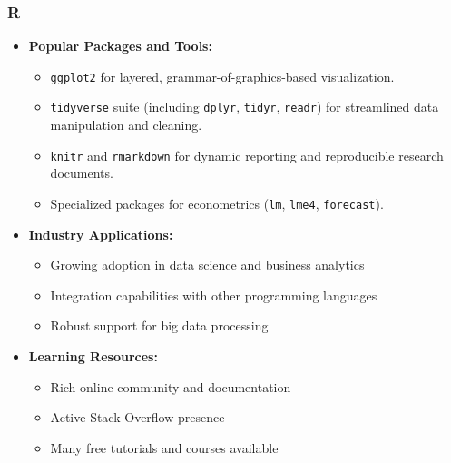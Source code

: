 \documentclass[10pt]{beamer}
\begin{document}
\begin{frame}
    \frametitle{R}
    \begin{itemize}
        \item \textbf{Popular Packages and Tools:}
            \begin{itemize}
                \item \texttt{ggplot2} for layered, grammar-of-graphics-based visualization.
                \item \texttt{tidyverse} suite (including \texttt{dplyr}, \texttt{tidyr}, \texttt{readr}) for streamlined data manipulation and cleaning.
                \item \texttt{knitr} and \texttt{rmarkdown} for dynamic reporting and reproducible research documents.
                \item Specialized packages for econometrics (\texttt{lm}, \texttt{lme4}, \texttt{forecast}).
            \end{itemize}
        \item \textbf{Industry Applications:}
            \begin{itemize}
                \item Growing adoption in data science and business analytics
                \item Integration capabilities with other programming languages
                \item Robust support for big data processing
            \end{itemize}
        \item \textbf{Learning Resources:}
            \begin{itemize}
                \item Rich online community and documentation
                \item Active Stack Overflow presence
                \item Many free tutorials and courses available
            \end{itemize}
    \end{itemize}
\end{frame}
\end{document}

